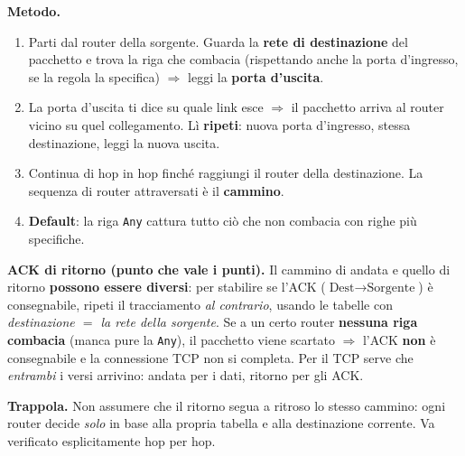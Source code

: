 \documentclass[11pt,a4paper]{report}
\begin{document}
\textbf{Metodo.}
\begin{enumerate}[noitemsep]
\item Parti dal router della sorgente. Guarda la \textbf{rete di destinazione}
del pacchetto e trova la riga che combacia (rispettando anche la porta
d'ingresso, se la regola la specifica) $\Rightarrow$ leggi la \textbf{porta
d'uscita}.
\item La porta d'uscita ti dice su quale link esce $\Rightarrow$ il pacchetto
arriva al router vicino su quel collegamento. Lì \textbf{ripeti}: nuova porta
d'ingresso, stessa destinazione, leggi la nuova uscita.
\item Continua di hop in hop finché raggiungi il router della destinazione. La
sequenza di router attraversati è il \textbf{cammino}.
\item \textbf{Default}: la riga \texttt{Any} cattura tutto ciò che non combacia
con righe più specifiche.
\end{enumerate}

\textbf{ACK di ritorno (punto che vale i punti).} Il cammino di andata e quello
di ritorno \textbf{possono essere diversi}: per stabilire se l'ACK
($\text{Dest}\to\text{Sorgente}$) è consegnabile, ripeti il tracciamento
\emph{al contrario}, usando le tabelle con \emph{destinazione $=$ la rete della
sorgente}. Se a un certo router \textbf{nessuna riga combacia} (manca pure la
\texttt{Any}), il pacchetto viene scartato $\Rightarrow$ l'ACK \textbf{non} è
consegnabile e la connessione TCP non si completa. Per il TCP serve che
\emph{entrambi} i versi arrivino: andata per i dati, ritorno per gli ACK.

\textbf{Trappola.} Non assumere che il ritorno segua a ritroso lo stesso cammino:
ogni router decide \emph{solo} in base alla propria tabella e alla destinazione
corrente. Va verificato esplicitamente hop per hop.
\end{document}
